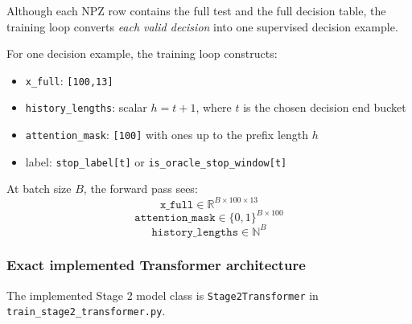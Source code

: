 \documentclass[11pt]{article}
\begin{document}
Although each NPZ row contains the full test and the full decision table, the training loop converts \emph{each valid decision} into one supervised decision example.

For one decision example, the training loop constructs:
\begin{itemize}
\item \texttt{x\_full}: \texttt{[100,13]}
\item \texttt{history\_lengths}: scalar \(h = t+1\), where \(t\) is the chosen decision end bucket
\item \texttt{attention\_mask}: \texttt{[100]} with ones up to the prefix length \(h\)
\item label: \texttt{stop\_label[t]} or \texttt{is\_oracle\_stop\_window[t]}
\end{itemize}

At batch size \(B\), the forward pass sees:
\[
\texttt{x\_full} \in \mathbb{R}^{B \times 100 \times 13}
\]
\[
\texttt{attention\_mask} \in \{0,1\}^{B \times 100}
\]
\[
\texttt{history\_lengths} \in \mathbb{N}^{B}
\]

\subsubsection*{Exact implemented Transformer architecture}

The implemented Stage 2 model class is \texttt{Stage2Transformer} in \texttt{train\_stage2\_transformer.py}.
\end{document}
